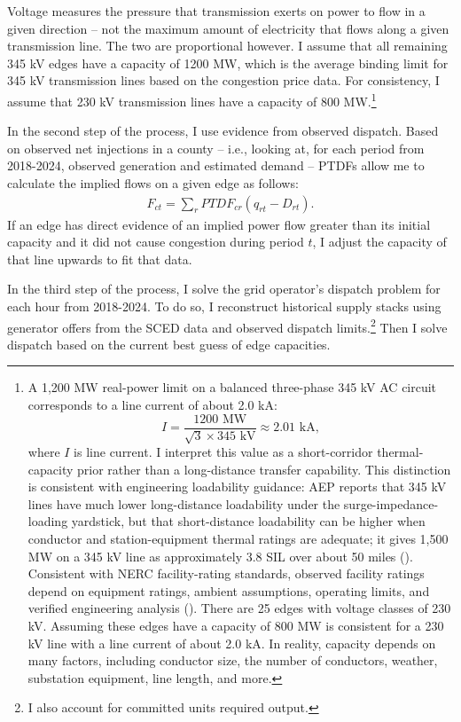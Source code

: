 \documentclass[12pt]{article}
\begin{document}
Voltage measures the pressure that transmission exerts on power to flow in a given direction -- not the maximum amount of electricity that flows along a given transmission line. The two are proportional however. I assume that all remaining 345 kV edges have a capacity of 1200 MW, which is the average binding limit for 345 kV transmission lines based on the congestion price data. For consistency, I assume that 230 kV transmission lines have a capacity of 800 MW.\footnote{A 1,200 MW real-power limit on a balanced three-phase 345 kV AC circuit corresponds to a line current of about 2.0 kA:
\[
I = \frac{1200\text{ MW}}{\sqrt{3}\times 345\text{ kV}} \approx 2.01\text{ kA},
\]
where $I$ is line current. I interpret this value as a short-corridor thermal-capacity prior rather than a long-distance transfer capability. This distinction is consistent with engineering loadability guidance: AEP reports that 345 kV lines have much lower long-distance loadability under the surge-impedance-loading yardstick, but that short-distance loadability can be higher when conductor and station-equipment thermal ratings are adequate; it gives 1,500 MW on a 345 kV line as approximately 3.8 SIL over about 50 miles (\cite{AEPTransmissionFacts,DunlopGutmanMarchenko1979}). Consistent with NERC facility-rating standards, observed facility ratings depend on equipment ratings, ambient assumptions, operating limits, and verified engineering analysis (\cite{NERCFAC0085}). There are 25 edges with voltage classes of 230 kV. Assuming these edges have a capacity of 800 MW is consistent for a 230 kV line with a line current of about 2.0 kA. In reality, capacity depends on many factors, including conductor size, the number of conductors, weather, substation equipment, line length, and more.} 

In the second step of the process, I use evidence from observed dispatch. Based on observed net injections in a county -- i.e., looking at, for each period from 2018-2024, observed generation and estimated demand -- PTDFs allow me to calculate the implied flows on a given edge as follows:
\begin{align}
    F_{ct} = \sum_r PTDF_{cr}(q_{rt} - D_{rt}).
\end{align}
If an edge has direct evidence of an implied power flow greater than its initial capacity and it did not cause congestion during period $t$, I adjust the capacity of that line upwards to fit that data. 

In the third step of the process, I solve the grid operator's dispatch problem for each hour from 2018-2024. To do so, I reconstruct historical supply stacks using generator offers from the SCED data and observed dispatch limits.\footnote{I also account for committed units required output.} Then I solve dispatch based on the current best guess of edge capacities. 
\end{document}
